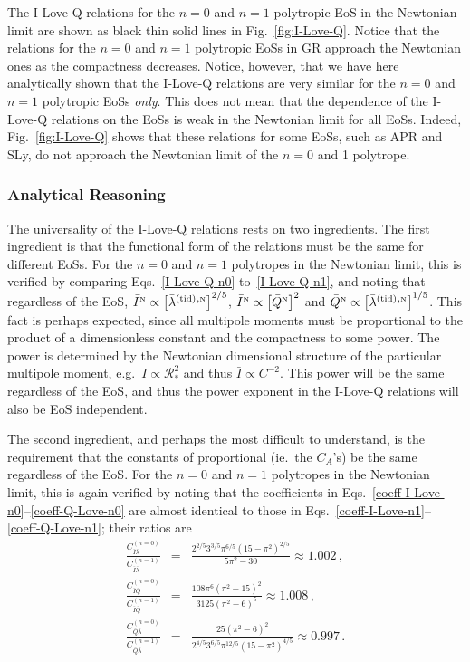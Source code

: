 \documentclass[aps,twocolumn,nofootinbib,showpacs,superscriptaddress,hyperref]{revtex4-1}
\newcommand\ba{\begin{eqnarray}}
\newcommand\ea{\end{eqnarray}}
\newcommand{\RNS}{\mathcal{R}_*}
\newcommand{\tid}{\mathrm{(tid)}}
\newcommand{\N}{{\mbox{\tiny N}}}
\newcommand{\Qbar}{\bar{Q}}
\begin{document}
The I-Love-Q relations for the $n=0$ and $n=1$ polytropic EoS in the Newtonian limit are shown as black thin solid lines in Fig.~\ref{fig:I-Love-Q}. Notice that the relations for the $n=0$ and $n=1$ polytropic EoSs in GR approach the Newtonian ones as the compactness decreases. Notice, however, that we have here analytically shown that the I-Love-Q relations are very similar for the $n=0$ and $n=1$ polytropic EoSs \emph{only}. This does not mean that the dependence of the I-Love-Q relations on the EoSs is weak in the Newtonian limit for all EoSs. Indeed, Fig.~\ref{fig:I-Love-Q} shows that these relations for some EoSs, such as APR and SLy,  do not approach the Newtonian limit of the $n=0$ and 1 polytrope. 

\subsubsection{Analytical Reasoning}

The universality of the I-Love-Q relations rests on two ingredients. The first ingredient is that the functional form of the relations must
be the same for different EoSs. For the $n=0$ and $n=1$ polytropes in the Newtonian limit, this is verified by comparing Eqs.~\eqref{I-Love-Q-n0} to~\eqref{I-Love-Q-n1}, and noting that regardless of the EoS, $\bar{I}^\N \propto  \left[ \bar{\lambda}^\tid{}^{,\N} \right]^{2/5}$, $\bar{I}^\N \propto \left[ \Qbar^{\N} \right]^{2}$ and $\Qbar^{\N} \propto \left[ \bar{\lambda}^\tid{}^{,\N} \right]^{1/5}$. This fact is perhaps expected, since all multipole moments must be proportional to the product of a dimensionless constant and the compactness to some power. The power is determined by the Newtonian dimensional structure of the particular multipole moment, e.g.~$I \propto \RNS^{2}$ and thus $\bar{I} \propto C^{-2}$. This power will be the same regardless of the EoS, and thus the power exponent in the I-Love-Q relations will also be EoS independent. 

The second ingredient, and perhaps the most difficult to understand, is the requirement that the constants of proportional  (ie.~the $C_{A}$'s) be the same regardless of the EoS. For the $n=0$ and $n=1$ polytropes in the Newtonian limit, this is again verified by noting that the coefficients in Eqs.~\eqref{coeff-I-Love-n0}--\eqref{coeff-Q-Love-n0} are almost identical to those in Eqs.~\eqref{coeff-I-Love-n1}--\eqref{coeff-Q-Love-n1}; their ratios are
%
\ba
\frac{C_{\bar{I} \bar{\lambda}}^{(n=0)}}{C_{\bar{I} \bar{\lambda}}^{(n=1)}} &=& \frac{2^{2/5} 3^{3/5} \pi^{6/5} (15-\pi^2)^{2/5}}{5 \pi^2-30} \approx 1.002\,, \\
\frac{C_{\bar{I} \bar{Q}}^{(n=0)}}{C_{\bar{I} \bar{Q}}^{(n=1)}} &=& \frac{108 \pi^6 (\pi^2-15)^2}{3125 (\pi^2-6)^5} \approx 1.008\,, \\
\frac{C_{\bar{Q} \bar{\lambda}}^{(n=0)}}{C_{\bar{Q} \bar{\lambda}}^{(n=1)}} &=& \frac{25 (\pi^2-6)^2}{ 2^{4/5} 3^{6/5} \pi^{12/5} (15-\pi^2)^{4/5}} \approx 0.997\,.
\ea
% 
\end{document}
